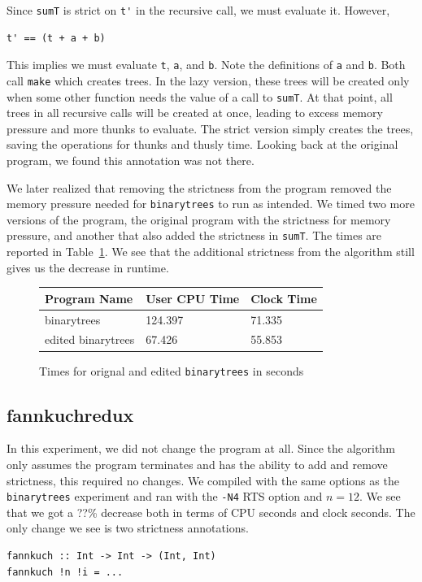 \documentclass[preprint,nocopyrightspace]{sigplanconf}
\begin{document}
Since \lstinline!sumT! is strict on \lstinline!t'! in the recursive call, we must evaluate it. However,
\begin{lstlisting}
t' == (t + a + b)
\end{lstlisting}
This implies we must evaluate \lstinline!t!, \lstinline!a!, and \lstinline!b!. Note the definitions of \lstinline!a! and \lstinline!b!. Both call \lstinline!make! which creates trees. In the lazy version, these trees will be created only when some other function needs the value of a call to \lstinline!sumT!. At that point, all trees in all recursive calls will be created at once, leading to excess memory pressure and more thunks to evaluate. The strict version simply creates the trees, saving the operations for thunks and thusly time. Looking back at the original program, we found this annotation was not there. 

We later realized that removing the strictness from the program removed the memory pressure needed for \lstinline!binarytrees! to run as intended. We timed two more versions of the program, the original program with the strictness for memory pressure, and another that also added the strictness in \lstinline!sumT!. The times are reported in Table~\ref{tab:btree}. We see that the additional strictness from the algorithm still gives us the decrease in runtime.
\begin{figure}[t]
\label{tab:btree}
\begin{tabular}{| l | l | l |}
\hline
Program Name & User CPU Time & Clock Time\\
\hline
binarytrees & 124.397 & 71.335\\
\hline
edited binarytrees & 67.426 & 55.853\\
\hline
\end{tabular}
\caption{Times for orignal and edited \lstinline!binarytrees! in seconds}
\end{figure}
\subsection{fannkuchredux}
In this experiment, we did not change the program at all. Since the algorithm only assumes the program terminates and has the ability to add and remove strictness, this required no changes. We compiled with the same options as the \lstinline!binarytrees! experiment and ran with the \lstinline!-N4! RTS option and $n = 12$. We see that we got a ??\% decrease both in terms of CPU seconds and clock seconds. The only change we see is two strictness annotations.
\begin{lstlisting}
fannkuch :: Int -> Int -> (Int, Int)
fannkuch !n !i = ...
\end{lstlisting}
\end{document}
